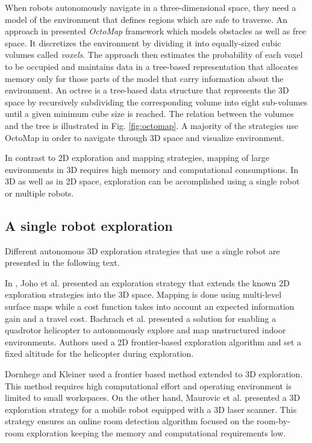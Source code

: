 When robots autonomously navigate in a three-dimensional space, they need a model of the environment that defines regions which are safe to traverse. An approach in \cite{Wurm2012} presented \textit{OctoMap} framework which models obstacles as well as free space. It discretizes the environment by dividing it into equally-sized cubic volumes called \textit{voxels}. The approach then estimates the probability of each voxel to be occupied and maintains data in a tree-based representation that allocates memory only for those parts of the model that carry information about the environment. 
An octree is a tree-based data structure that represents the 3D space by recursively subdividing the corresponding volume into eight sub-volumes until a given minimum cube size is reached. The relation between the volumes and the tree is illustrated in Fig. \ref{fig:octomap}. A majority of the strategies use OctoMap in order to navigate through 3D space and visualize environment.

In contrast to 2D exploration and mapping strategies, mapping of large environments in 3D requires high memory and computational consumptions. In 3D as well as in 2D space, exploration can be accomplished using a single robot or multiple robots.

\subsection{A single robot exploration}  
Different autonomous 3D exploration strategies that use a single robot are presented in the following text.

In \cite{Joho2007}, Joho et al. presented an exploration strategy that extends the known 2D exploration strategies into the 3D space. Mapping is done using multi-level surface maps while a cost function takes
into account an expected information gain and a travel cost. 
Bachrach et
al. \cite{Bachrach2009} presented a solution for enabling a quadrotor helicopter to autonomously explore and map unstructured indoor environments. Authors used a 2D frontier-based exploration algorithm and set a fixed altitude for the helicopter during exploration.  

Dornhege and Kleiner \cite{Dornhege2013} used a frontier based method extended to 3D exploration. This method requires high computational effort and operating environment is limited to small workspaces. On the other hand, Maurovic et al. \cite{Maurovic2014} presented a 3D exploration strategy for a mobile robot equipped with a 3D laser scanner. This strategy ensures an online room detection algorithm focused on the room-by-room exploration keeping the memory and computational requirements low.

